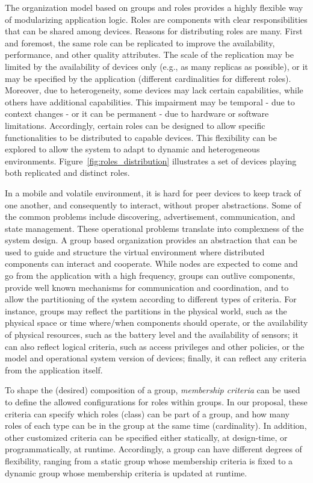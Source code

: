 The organization model based on groups and roles provides a highly flexible way of modularizing application logic. Roles are components with clear responsibilities that can be shared among devices. Reasons for distributing roles are many. First and foremost, the same role can be replicated to improve the availability, performance, and other quality attributes. The scale of the replication may be limited by the availability of devices only (e.g., as many replicas as possible), or it may be specified by the application (different cardinalities for different roles). Moreover, due to heterogeneity, some devices may lack certain capabilities, while others have additional capabilities. This impairment may be temporal - due to context changes - or it can be permanent - due to hardware or software limitations. Accordingly, certain roles can be designed to allow specific functionalities to be distributed to capable devices. This flexibility can be explored to allow the system to adapt to dynamic and heterogeneous environments. Figure~\ref{fig:roles_distribution} illustrates a set of devices playing both replicated and distinct roles.

In a mobile and volatile environment, it is hard for peer devices to keep track of one another, and consequently to interact, without proper abstractions. Some of the common problems include discovering, advertisement, communication, and state management. These operational problems translate into complexness of the system design. A group based organization provides an abstraction that can be used to guide and structure the virtual environment where distributed components can interact and cooperate. While nodes are expected to come and go from the application with a high frequency, groups can outlive components, provide well known mechanisms for communication and coordination, and to allow the partitioning of the system according to different types of criteria. For instance, groups may reflect the partitions in the physical world, such as the physical space or time where/when components should operate, or the availability of physical resources, such as the battery level and the availability of sensors; it can also reflect logical criteria, such as access privileges and other policies, or the model and operational system version of devices; finally, it can reflect any criteria from the application itself.%

To shape the (desired) composition of a group, \textit{membership criteria} can be used to define the allowed configurations for roles within groups. In our proposal, these criteria can specify which roles (class) can be part of a group, and how many roles of each type can be in the group at the same time (cardinality). In addition, other customized criteria can be specified either statically, at design-time, or programmatically, at runtime. Accordingly, a group can have different degrees of flexibility, ranging from a static group whose membership criteria is fixed to a dynamic group whose membership criteria is updated at runtime.

